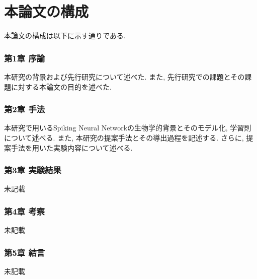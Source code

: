 \section{本論文の構成}
本論文の構成は以下に示す通りである.

\subsubsection{第1章 序論}
本研究の背景および先行研究について述べた.
また, 先行研究での課題とその課題に対する本論文の目的を述べた.

\subsubsection{第2章 手法}
本研究で用いるSpiking Neural Networkの生物学的背景とそのモデル化, 学習則について述べる.
また, 本研究の提案手法とその導出過程を記述する.
さらに, 提案手法を用いた実験内容について述べる.

\subsubsection{第3章 実験結果}
未記載

\subsubsection{第4章 考察}
未記載

\subsubsection{第5章 結言}
未記載
